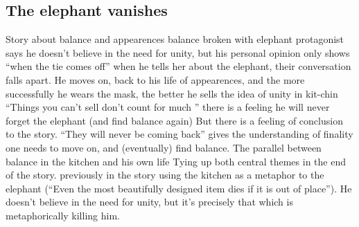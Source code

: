 \documentclass[12pt,a4paper]{article}
\begin{document}
\subsection{The elephant vanishes}
\begin{outline}[enumerate]
    \1 Story about balance and appearences
        \2 balance broken with elephant
        \2 protagonist says he doesn't believe in the need for unity, but his personal opinion only shows ``when the tie comes off''
    \1 when he tells her about the elephant, their conversation falls apart. 
    \1 He moves on, back to his life of appearences, and the more successfully he wears the mask, the better he sells the idea of unity in kit-chin
        \2 ``Things you can't sell don't count for much ''
    \1 there is a feeling he will never forget the elephant (and find balance again)
        \2 But there is a feeling of conclusion to the story. ``They will never be coming back'' gives the understanding of finality one needs to move on, and (eventually) find balance.
        \2 The parallel between balance in the kitchen and his own life
        \2 Tying up both central themes in the end of the story.
            \3 previously in the story using the kitchen as a metaphor to the elephant (``Even the most beautifully designed item dies if it is out of place''). He doesn't believe in the need for unity, but it's precisely that which is metaphorically killing him.  
\end{outline}
\end{document}
